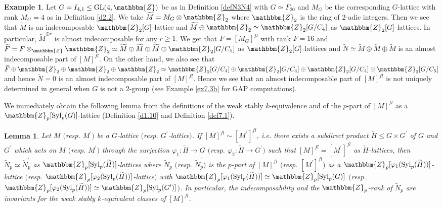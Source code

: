 \documentclass{amsart}
\theoremstyle{plain}
\newtheorem{lemma}[theorem]{Lemma}
\theoremstyle{definition}
\newtheorem{example}[theorem]{Example}
\theoremstyle{remark}
\newcommand{\bZ}{\mathbbm{Z}}\newcommand{\bQ}{\mathbbm{Q}}
\newcommand{\Syl}{{\rm Syl}}
\newcounter{sub}\def\tr{\mbox{tr }}
\begin{document}
%
\begin{example}\label{ex7.3}
Let $G=I_{4,1}\leq {\rm GL}(4,\bZ)$ be as in Definition \ref{defN3N4} 
with $G\simeq F_{20}$ 
and $M_G$ be the corresponding $G$-lattice with rank $M_G=4$ 
as in Definition \ref{d2.2}. 
We take $\widetilde{M}=M_G\otimes \bZ_2$ where $\bZ_2$ is the ring of $2$-adic integers. 
Then we see that 
$\widetilde{M}$ is an indecomposable $\bZ_2[G]$-lattice and 
$\widetilde{M}\oplus \bZ_2\simeq \bZ_2[G/C_4]$ as $\bZ_2[G]$-lattices. 
In particular, $\widetilde{M}^{\oplus r}$ is almost indecomposable for any $r\geq 1$. 
We get that $F=[M_G]^{fl}$ with rank $F=16$ 
and $\widetilde{F}=F\otimes_\bZ \bZ_2\simeq 
\widetilde{M}\oplus \widetilde{M}\oplus \widetilde{M}\oplus \bZ_2[G/C_5]$ as $\bZ_2[G]$-lattices 
and $\widetilde{N}\simeq \widetilde{M}\oplus \widetilde{M}\oplus \widetilde{M}$ is an 
almost indecomposable part of $[M]^{fl}$. 
On the other hand, we also see that 
$\widetilde{F}\oplus\bZ_2\oplus\bZ_2\oplus\bZ_2\simeq 
\bZ_2[G/C_4]\oplus\bZ_2[G/C_4]\oplus\bZ_2[G/C_4]\oplus\bZ_2[G/C_5]$ 
and hence $\widetilde{N}=0$ is an 
almost indecomposable part of $[M]^{fl}$. 
Hence we see that an 
almost indecomposable part of $[M]^{fl}$ is not uniquely determined 
in general when $G$ is not a $2$-group 
(see Example \ref{ex7.3b} for GAP computations). 
\end{example}

We immediately obtain the following lemma
from the definitions of the weak stably $k$-equivalence 
and of the $p$-part of $[M]^{fl}$ as a $\bZ_p[\Syl_p(G)]$-lattice 
(Definition \ref{d1.10} and Definition \ref{def7.1}). 
%
\begin{lemma}\label{lem7.2b}
Let $M$ $($resp. $M^\prime$$)$ be a $G$-lattice $($resp. $G^\prime$-lattice$)$. 
If $[M]^{fl}\sim [M^\prime]^{fl}$, 
i.e. there exists a subdirect product $\widetilde{H}\leq G\times G^\prime$ 
of $G$ and $G^\prime$ which acts on $M$ $($resp. $M^\prime)$ 
through the surjection 
$\varphi_1:\widetilde{H}\rightarrow G$ 
$($resp. $\varphi_2:\widetilde{H}\rightarrow G^\prime$$)$ 
such that $[M]^{fl}=[M^\prime]^{fl}$ as $\widetilde{H}$-lattices, 
then 
$\widetilde{N}_p\simeq \widetilde{N}^\prime_p$ 
as $\bZ_p[\Syl_p(\widetilde{H})]$-lattices 
where $\widetilde{N}_p$ $($resp. $\widetilde{N}^\prime_p$$)$ 
is the $p$-part of $[M]^{fl}$ $($resp. $[M^\prime]^{fl}$$)$ 
as a $\bZ_p[\varphi_1(\Syl_p(\widetilde{H}))]$-lattice 
$($resp. $\bZ_p[\varphi_2(\Syl_p(\widetilde{H}))]$-lattice$)$ 
with $\bZ_p[\varphi_1(\Syl_p(\widetilde{H}))]\simeq \bZ_p[\Syl_p(G)]$ 
$($resp. 
$\bZ_p[\varphi_2(\Syl_p(\widetilde{H}))]\simeq \bZ_p[\Syl_p(G^\prime)]$$)$. 
In particular, the indecomposability and 
the $\bZ_p$-rank of $\widetilde{N}_p$ are invariants for the 
weak stably $k$-equivalent classes of $[M]^{fl}$. 
\end{lemma}
%
\end{document}

